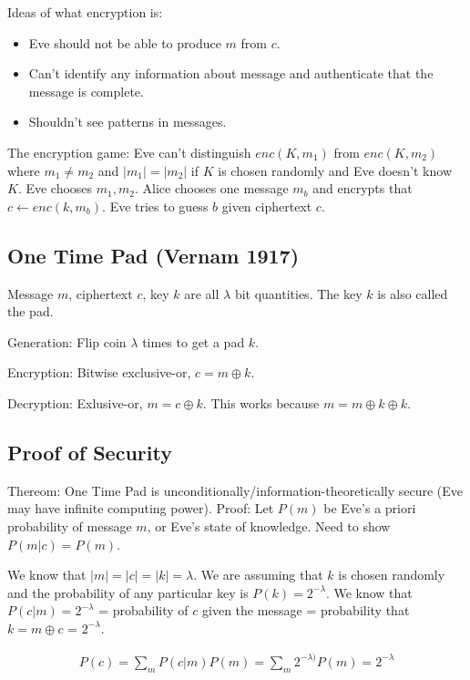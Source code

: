 \documentclass[psamsfonts]{amsart}
\begin{document}
Ideas of what encryption is:
\begin{itemize}
\item Eve should not be able to produce $m$ from $c$. 
\item Can't identify any information about message and authenticate that the message is complete.
\item Shouldn't see patterns in messages.
\end{itemize}

The encryption game: Eve can't distinguish $enc(K,m_1)$ from $enc(K, m_2)$ where $m_1 \neq m_2$ and $|m_1| = |m_2|$ if $K$ is chosen randomly and Eve doesn't know $K$. Eve chooses $m_1, m_2$. Alice chooses one message $m_b$ and encrypts that $c \leftarrow enc(k, m_b)$. Eve tries to guess $b$ given ciphertext $c$.

\subsection{One Time Pad (Vernam 1917)}

Message $m$, ciphertext $c$, key $k$ are all $\lambda$ bit quantities. The key $k$ is also called the pad. 

Generation: Flip coin $\lambda$ times to get a pad $k$. 

Encryption: Bitwise exclusive-or, $c = m \oplus k$.

Decryption: Exlusive-or, $m = c \oplus k$. This works because $m = m \oplus k \oplus k$.

\subsection{Proof of Security}

Thereom: One Time Pad is unconditionally/information-theoretically secure (Eve may have infinite computing power). 
Proof: Let $P(m)$ be Eve's a priori probability of message $m$, or Eve's state of knowledge. Need to show $P(m | c) = P(m)$. 

We know that $|m| = |c| = |k| = \lambda$. We are assuming that $k$ is chosen randomly and the probability of any particular key is $P(k) = 2^{-\lambda}$. We know that $P(c|m) = 2^{-\lambda}$ = probability of $c$ given the message = probability that $k = m \oplus c$ = $2^{-\lambda}$.

\begin{eqnarray}
  P(c) = \sum_{m} P(c|m) P(m) = \sum_{m} 2^{-\lambda)} P(m) = 2^{-\lambda}
\end{eqnarray}
\end{document}
